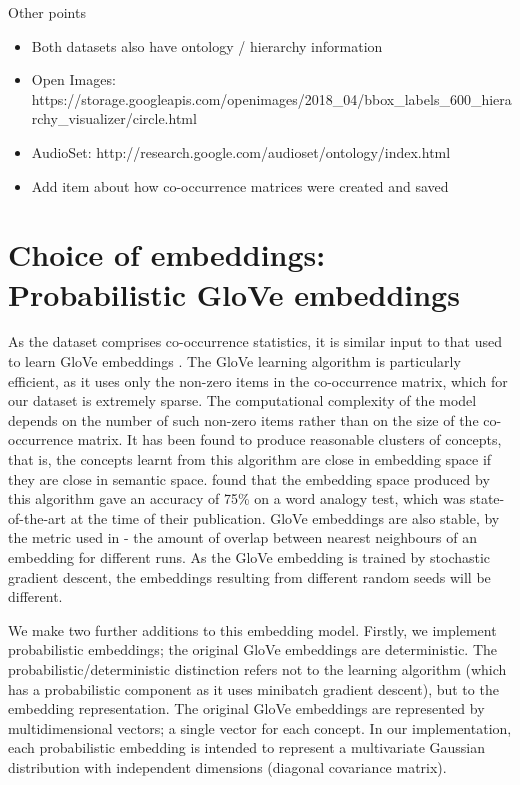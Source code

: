 Other points

\begin{itemize}
    \item Both datasets also have ontology / hierarchy information
    \item Open Images: https://storage.googleapis.com/openimages/2018\_04/bbox\_labels\_600\_hierarchy\_visualizer/circle.html
    \item AudioSet: http://research.google.com/audioset/ontology/index.html
    \item Add item about how co-occurrence matrices were created and saved
\end{itemize}

\section{Choice of embeddings: Probabilistic GloVe embeddings}

As the dataset comprises co-occurrence statistics, it is similar input to that used to learn GloVe embeddings \cite{pennington2014glove}. The GloVe learning algorithm is particularly efficient, as it uses only the non-zero items in the co-occurrence matrix, which for our dataset is extremely sparse. The computational complexity of the model depends on the number of such non-zero items rather than on the size of the co-occurrence matrix. It has been found to produce reasonable clusters of concepts, that is, the concepts learnt from this algorithm are close in embedding space if they are close in semantic space. \cite{pennington2014glove} found that the embedding space produced by this algorithm gave an accuracy of 75\% on a word analogy test, which was state-of-the-art at the time of their publication. GloVe embeddings are also stable, by the metric used in \cite{WordEmbeddingStability}- the amount of overlap between nearest neighbours of an embedding for different runs. As the GloVe embedding is trained by stochastic gradient descent, the embeddings resulting from different random seeds will be different.

We make two further additions to this embedding model. Firstly, we implement probabilistic embeddings; the original GloVe embeddings are deterministic. The probabilistic/deterministic distinction refers not to the learning algorithm (which has a probabilistic component as it uses minibatch gradient descent), but to the embedding representation. The original GloVe embeddings are represented by multidimensional vectors; a single vector for each concept. In our implementation, each probabilistic embedding is intended to represent a multivariate Gaussian distribution with independent dimensions (diagonal covariance matrix). 

